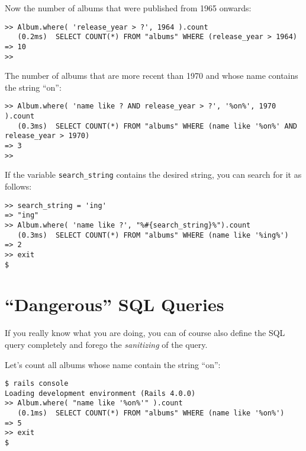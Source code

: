 \documentclass[a4paper]{book}
\begin{document}
Now the number of albums that were published from 1965 onwards:

\begin{shaded}\begin{verbatim}
>> Album.where( 'release_year > ?', 1964 ).count
   (0.2ms)  SELECT COUNT(*) FROM "albums" WHERE (release_year > 1964)
=> 10
>>
\end{verbatim}\end{shaded}

The number of albums that are more recent than 1970 and whose name contains the string “on”:

\begin{shaded}\begin{verbatim}
>> Album.where( 'name like ? AND release_year > ?', '%on%', 1970 ).count
   (0.3ms)  SELECT COUNT(*) FROM "albums" WHERE (name like '%on%' AND release_year > 1970)
=> 3
>>
\end{verbatim}\end{shaded}

If the variable \texttt{search\_string} contains the desired string, you can search for it as follows:

\begin{shaded}\begin{verbatim}
>> search_string = 'ing'
=> "ing"
>> Album.where( 'name like ?', "%#{search_string}%").count
   (0.3ms)  SELECT COUNT(*) FROM "albums" WHERE (name like '%ing%')
=> 2
>> exit
$
\end{verbatim}\end{shaded}

\section{“Dangerous” SQL Queries}\label{dangerous-sql-queries}

If you really know what you are doing, you can of course also define the SQL query completely and forego the \emph{sanitizing} of the query.

Let's count all albums whose name contain the string “on”:

\begin{shaded}\begin{verbatim}
$ rails console
Loading development environment (Rails 4.0.0)
>> Album.where( "name like '%on%'" ).count
   (0.1ms)  SELECT COUNT(*) FROM "albums" WHERE (name like '%on%')
=> 5
>> exit
$
\end{verbatim}\end{shaded}
\end{document}

